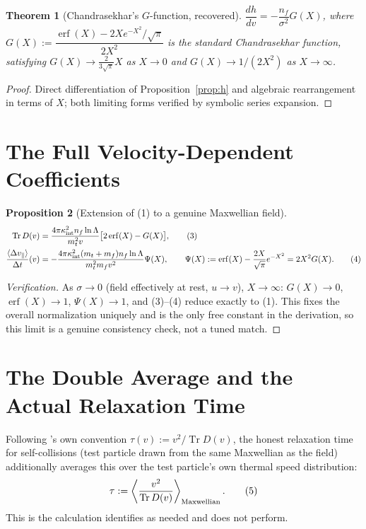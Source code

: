 \documentclass[12pt]{amsart}
\theoremstyle{plain}
\newtheorem{theorem}{Theorem}[section]
\newtheorem{proposition}[theorem]{Proposition}
\theoremstyle{remark}
\begin{document}
\begin{theorem}[Chandrasekhar's $G$-function, recovered]\label{thm:G}
$\dfrac{dh}{dv} = -\dfrac{n_f}{\sigma^2}G(X)$, where $G(X):=\dfrac{\operatorname{erf}(X)-2Xe^{-X^2}/\sqrt\pi}{2X^2}$ is the standard Chandrasekhar function, satisfying $G(X)\to\tfrac{2}{3\sqrt\pi}X$ as $X\to0$ and $G(X)\to1/(2X^2)$ as $X\to\infty$.
\end{theorem}

\begin{proof}
Direct differentiation of Proposition~\ref{prop:h} and algebraic rearrangement in terms of $X$; both limiting forms verified by symbolic series expansion.
\end{proof}

\section{The Full Velocity-Dependent Coefficients}

\begin{proposition}[Extension of (1) to a genuine Maxwellian field]\label{prop:full}
\begin{align}
\operatorname{Tr}D(v) &= \frac{4\pi\kappa_{\rm int}^2n_f\ln\Lambda}{m_t^2v}\big[2\operatorname{erf}(X)-G(X)\big], \tag{3}\\
\frac{\langle\Delta v_\parallel\rangle}{\Delta t}(v) &= -\frac{4\pi\kappa_{\rm int}^2(m_t+m_f)n_f\ln\Lambda}{m_t^2m_fv^2}\Psi(X), \qquad \Psi(X):=\operatorname{erf}(X)-\frac{2X}{\sqrt\pi}e^{-X^2}=2X^2G(X). \tag{4}
\end{align}
\end{proposition}

\begin{proof}[Verification]
As $\sigma\to0$ (field effectively at rest, $u\to v$), $X\to\infty$: $G(X)\to0$, $\operatorname{erf}(X)\to1$, $\Psi(X)\to1$, and (3)--(4) reduce exactly to (1). This fixes the overall normalization uniquely and is the only free constant in the derivation, so this limit is a genuine consistency check, not a tuned match.
\end{proof}

\section{The Double Average and the Actual Relaxation Time}

Following \cite{Ebert2026Bath,Ebert2026Cluster}'s own convention $\tau(v):=v^2/\operatorname{Tr}D(v)$, the honest relaxation time for self-collisions (test particle drawn from the same Maxwellian as the field) additionally averages this over the test particle's own thermal speed distribution:
\begin{equation}
\tau := \left\langle\frac{v^2}{\operatorname{Tr}D(v)}\right\rangle_{\rm Maxwellian}. \tag{5}
\end{equation}
This is the calculation \cite{Ebert2026Residual} identifies as needed and does not perform.
\end{document}
